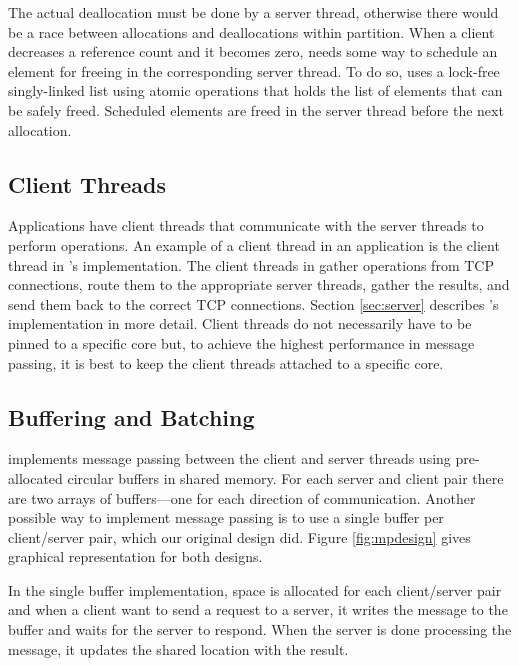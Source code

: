 The actual deallocation must be done by a server thread, otherwise there would
be a race between allocations and deallocations within partition. When a client
decreases a reference count and it becomes zero, \cphash{} needs some way to
schedule an element for freeing in the corresponding server thread.  To do so,
\cphash{} uses a lock-free singly-linked list using atomic operations that holds
the list of elements that can be safely freed. Scheduled elements are freed in
the server thread before the next allocation.


\subsection{Client Threads}
\label{sec:clientthreads}

Applications have client threads that communicate with the server threads to
perform operations. An example of a client thread in an application is the
client thread in \cpserver{}'s implementation. The client threads in \cpserver{}
gather operations from TCP connections, route them to the appropriate server
threads, gather the results, and send them back to the correct TCP
connections. Section \ref{sec:server} describes \cpserver{}'s implementation in
more detail.  Client threads do not necessarily have to be pinned to a specific
core but, to achieve the highest performance in message passing, it is best to
keep the client threads attached to a specific core.

\subsection{Buffering and Batching}
\label{sec:msgpassing}

\cphash{} implements message passing between the client and server threads using
pre-allocated circular buffers in shared memory.  For each server and client
pair there are two arrays of buffers---one for each direction of
communication. Another possible way to implement message passing is to use a
single buffer per client/server pair, which our original design did.  Figure
\ref{fig:mpdesign} gives graphical representation for both designs.

In the single buffer implementation, space is allocated for each client/server
pair and when a client want to send a request to a server, it writes the message
to the buffer and waits for the server to respond. When the server is done
processing the message, it updates the shared location with the result.

